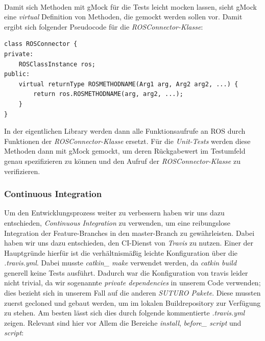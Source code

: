 \documentclass{suturo}
\begin{document}
 $~$ \\
Damit sich Methoden mit gMock für die Tests leicht mocken lassen, sieht gMock eine \textit{virtual} Definition von Methoden, die gemockt werden sollen vor. Damit ergibt sich folgender Pseudocode für die \textit{ROSConnector-Klasse}: \\

\begin{verbatim}
class ROSConnector {
private:
    ROSClassInstance ros;
public:
    virtual returnType ROSMETHODNAME(Arg1 arg, Arg2 arg2, ...) {
        return ros.ROSMETHODNAME(arg, arg2, ...);
    }
}
\end{verbatim}

In der eigentlichen Library werden dann alle Funktionsaufrufe an ROS durch Funktionen der \textit{ROSConnector-Klasse} ersetzt. Für die \textit{Unit-Tests} werden diese Methoden dann mit gMock gemockt, um deren Rückgabewert im Testumfeld genau spezifizieren zu können und den Aufruf der \textit{ROSConnector-Klasse} zu verifizieren.



\subsubsection{Continuous Integration}
Um den Entwicklungsprozess weiter zu verbessern haben wir uns dazu entschieden, \textit{Continuous Integration} zu verwenden, um eine reibungslose Integration der Feature-Branches in den master-Branch zu gewährleisten. Dabei haben wir uns dazu entschieden, den CI-Dienst von \textit{Travis} zu nutzen. Einer der Hauptgründe hierfür ist die verhältnismäßig leichte Konfiguration über die \textit{.travis.yml}. Dabei musste \textit{catkin\_ make} verwendet werden, da \textit{catkin build} generell keine Tests ausführt. Dadurch war die Konfiguration von travis leider nicht trivial, da wir sogenannte \textit{private dependencies} in unserem Code verwenden; dies bezieht sich in unserem Fall auf die anderen \textit{SUTURO Pakete}. Diese mussten zuerst gecloned und gebaut werden, um im lokalen Buildrepository zur Verfügung zu stehen. Am besten lässt sich dies durch folgende kommentierte \textit{.travis.yml} zeigen. Relevant sind hier vor Allem die Bereiche \textit{install}, \textit{before\_ script} und \textit{script}: \\
\end{document}
